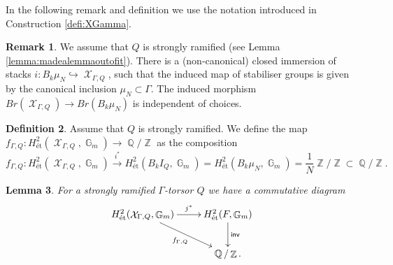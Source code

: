 \documentclass{article}
\DeclareMathOperator{\inv}{\mathsf{inv}}
\DeclareMathOperator{\Xc}{\mathcal{X}}
\DeclareMathOperator{\Zb}{\mathbb{Z}}
\DeclareMathOperator{\G}{\mathbb{G}}
\DeclareMathOperator{\Qb}{\mathbb{Q}}
\theoremstyle{definition}
\newtheorem{definition}{Definition}[section]
\newtheorem{rmk}[definition]{Remark}
\theoremstyle{plain}
\newtheorem{lemma}[definition]{Lemma}
\begin{document}
In the following remark and definition we use the notation introduced in Construction \ref{defi:XGamma}.

\begin{rmk}\label{rmk:noncan}
We assume that $Q$ is strongly ramified (see Lemma \ref{lemma:madealemmaoutofit}). There is a (non-canonical) closed immersion of stacks $i\colon B_k \mu_N \hookrightarrow \Xc_{\Gamma,Q}$, such that the induced map of stabiliser groups is given by the canonical inclusion $\mu_N \subset \Gamma$. The induced morphism $Br( \Xc_{\Gamma,Q}) \to Br(B_{k}\mu_N)$ is independent of choices. 
\end{rmk}

\begin{definition}
Assume that $Q$ is strongly ramified. We define the map $f_{\Gamma,Q}\colon H^2_{\text{\'et}}(\Xc_{\Gamma,Q},\G_m) \to \Qb/\Zb$ as the composition
\[f_{\Gamma,Q}\colon H^2_{\text{\'et}}(\Xc_{\Gamma,Q},\G_m) \xrightarrow{i^*} H^2_{\text{\'et}}(B_kI_Q,\G_m) = H^2_{\text{\'et}}(B_k\mu_N,\G_m) = \frac{1}{N}\Zb/\Zb \subset \Qb/\Zb.\]
\end{definition}

\begin{lemma}\label{lemma:pre_hasse}
For a strongly ramified $\Gamma$-torsor $Q$ we have a commutative diagram 
\[
\xymatrix{
H^2_{\text{\'et}}(\Xc_{\Gamma,Q},\G_m) \ar[r]^-{j^*} \ar[rd]_{f_{\Gamma,Q}} & H^2_{\text{\'et}}(F,\G_m) \ar[d]^{\inv} \\
 & \Qb/\Zb.
}
\]
\end{lemma}
\end{document}
